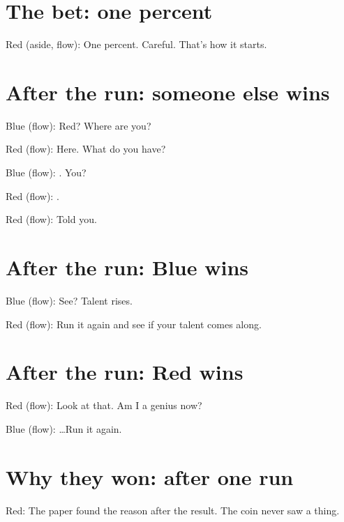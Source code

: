 \section{The bet: one percent}\label{bet:percent}

Red (aside, flow): One percent. Careful. That's how it starts.

\section{After the run: someone else wins}\label{run:other}

Blue (flow): Red? Where are you?

Red (flow): Here. What do you have?

Blue (flow): . You?

Red (flow): .

Red (flow): Told you.


\section{After the run: Blue wins}\label{run:blue}

Blue (flow): See? Talent rises.

Red (flow): Run it again and see if your talent comes along.


\section{After the run: Red wins}\label{run:red}

Red (flow): Look at that. Am I a genius now?

Blue (flow): …Run it again.


\section{Why they won: after one run}\label{why:once}

Red: The paper found the reason after the result.
The coin never saw a thing.

